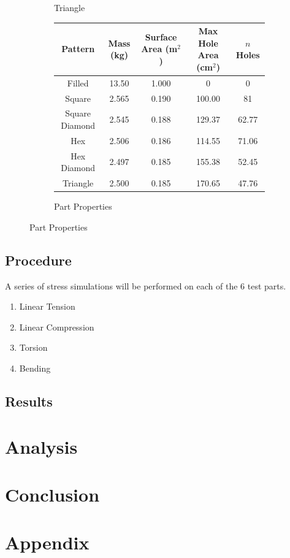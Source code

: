 \documentclass[12pt, letterpaper]{article}
\begin{document}
\begin{figure}[H]
\begin{subfigure}[b]{.3\linewidth}
		\caption{Triangle}
	\end{subfigure}
	\begin{subfigure}[b]{\linewidth}
	\begingroup
	\setlength{\tabcolsep}{10pt} %
	\renewcommand{\arraystretch}{1.5} %
		\begin{tabular}{ | c | c | c | c | c | }\hline
			Pattern 			& Mass (kg) 	& Surface Area (m$^2$)	& Max Hole Area (cm$^2$) 	& $n$ Holes 	\\\hline
			Filled				& 13.50 		& 1.000 						& 0			 					& 0			\\\hline
			Square			& 2.565 		& 0.190 						& 100.00		 					& 81			\\\hline
			Square Diamond	& 2.545 		& 0.188 						& 129.37	 						& 62.77		\\\hline
			Hex				& 2.506 		& 0.186 						& 114.55	 						& 71.06		\\\hline
			Hex Diamond		& 2.497 		& 0.185 						& 155.38	 						& 52.45		\\\hline
			Triangle			& 2.500 		& 0.185						& 170.65				 			& 47.76		\\\hline
		\end{tabular}
		\caption{Part Properties}
	\endgroup
	\end{subfigure}
\end{figure}

\subsection{Procedure}
\label{sec:procedure}

A series of stress simulations will be performed on each of the 6 test parts. 

\begin{enumerate}
\item Linear Tension
\item Linear Compression
\item Torsion
\item Bending
\end{enumerate}

\subsection{Results}
\label{sec:results}

\section{Analysis}
\label{sec:analysis}

\section{Conclusion}
\label{sec:conclusion}

\newpage
\printbibliography{}

\newpage
\section{Appendix}
\listoffigures{}
\end{document}
